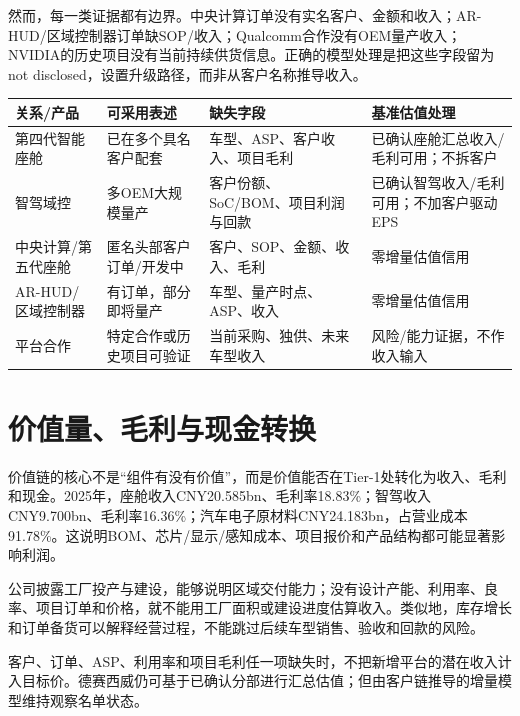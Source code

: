 然而，每一类证据都有边界。中央计算订单没有实名客户、金额和收入；AR-HUD/区域控制器订单缺SOP/收入；Qualcomm合作没有OEM量产收入；NVIDIA的历史项目没有当前持续供货信息。正确的模型处理是把这些字段留为not disclosed，设置升级路径，而非从客户名称推导收入。

\begin{exhibitbox}
\small
\begin{tabularx}{\textwidth}{L{2.6cm}Y Y Y}
\toprule
关系/产品 & 可采用表述 & 缺失字段 & 基准估值处理 \\
\midrule
第四代智能座舱 & 已在多个具名客户配套 & 车型、ASP、客户收入、项目毛利 & 已确认座舱汇总收入/毛利可用；不拆客户 \\
智驾域控 & 多OEM大规模量产 & 客户份额、SoC/BOM、项目利润与回款 & 已确认智驾收入/毛利可用；不加客户驱动EPS \\
中央计算/第五代座舱 & 匿名头部客户订单/开发中 & 客户、SOP、金额、收入、毛利 & 零增量估值信用 \\
AR-HUD/区域控制器 & 有订单，部分即将量产 & 车型、量产时点、ASP、收入 & 零增量估值信用 \\
平台合作 & 特定合作或历史项目可验证 & 当前采购、独供、未来车型收入 & 风险/能力证据，不作收入输入 \\
\bottomrule
\end{tabularx}
\end{exhibitbox}

\section{价值量、毛利与现金转换}

价值链的核心不是“组件有没有价值”，而是价值能否在Tier-1处转化为收入、毛利和现金。2025年，座舱收入CNY20.585bn、毛利率18.83\%；智驾收入CNY9.700bn、毛利率16.36\%；汽车电子原材料CNY24.183bn，占营业成本91.78\%。这说明BOM、芯片/显示/感知成本、项目报价和产品结构都可能显著影响利润。

公司披露工厂投产与建设，能够说明区域交付能力；没有设计产能、利用率、良率、项目订单和价格，就不能用工厂面积或建设进度估算收入。类似地，库存增长和订单备货可以解释经营过程，不能跳过后续车型销售、验收和回款的风险。

\begin{riskbox}[产业链估值底线]
客户、订单、ASP、利用率和项目毛利任一项缺失时，不把新增平台的潜在收入计入目标价。德赛西威仍可基于已确认分部进行汇总估值；但由客户链推导的增量模型维持观察名单状态。
\end{riskbox}
